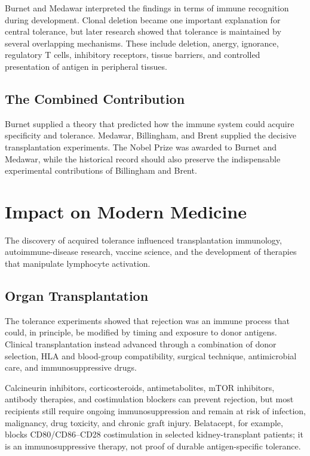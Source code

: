 Burnet and Medawar interpreted the findings in terms of immune recognition during development. Clonal deletion became one important explanation for central tolerance, but later research showed that tolerance is maintained by several overlapping mechanisms. These include deletion, anergy, ignorance, regulatory T cells, inhibitory receptors, tissue barriers, and controlled presentation of antigen in peripheral tissues.

\subsection{The Combined Contribution}

Burnet supplied a theory that predicted how the immune system could acquire specificity and tolerance. Medawar, Billingham, and Brent supplied the decisive transplantation experiments. The Nobel Prize was awarded to Burnet and Medawar, while the historical record should also preserve the indispensable experimental contributions of Billingham and Brent.

\section{Impact on Modern Medicine}

The discovery of acquired tolerance influenced transplantation immunology, autoimmune-disease research, vaccine science, and the development of therapies that manipulate lymphocyte activation.

\subsection{Organ Transplantation}

The tolerance experiments showed that rejection was an immune process that could, in principle, be modified by timing and exposure to donor antigens. Clinical transplantation instead advanced through a combination of donor selection, HLA and blood-group compatibility, surgical technique, antimicrobial care, and immunosuppressive drugs.

Calcineurin inhibitors, corticosteroids, antimetabolites, mTOR inhibitors, antibody therapies, and costimulation blockers can prevent rejection, but most recipients still require ongoing immunosuppression and remain at risk of infection, malignancy, drug toxicity, and chronic graft injury. Belatacept, for example, blocks CD80/CD86--CD28 costimulation in selected kidney-transplant patients; it is an immunosuppressive therapy, not proof of durable antigen-specific tolerance.

